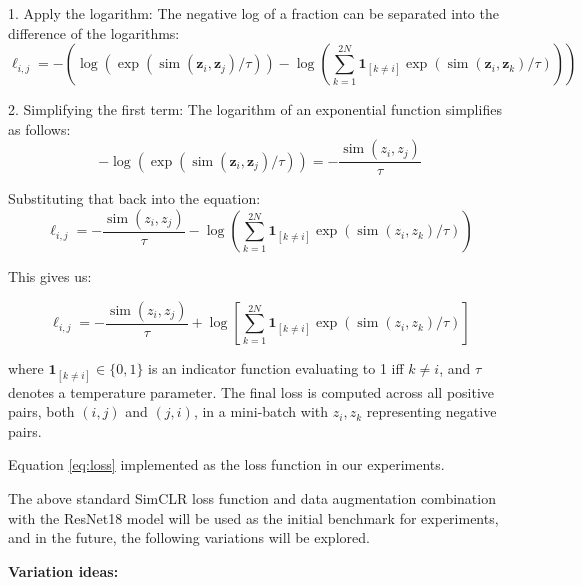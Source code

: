 \documentclass[12pt,twoside,a4paper,parskip]{scrbook} %
\begin{document}
1. Apply the logarithm: The negative log of a fraction can be separated into the difference of the logarithms:
\[
\ell_{i, j} = -\left( \log \left(\exp \left(\operatorname{sim}\left(\boldsymbol{z}_i, \boldsymbol{z}_j\right) / \tau\right)\right) - \log\left( \sum_{k=1}^{2 N} \mathbf{1}_{[k \neq i]} \exp \left(\operatorname{sim}\left(\boldsymbol{z}_i, \boldsymbol{z}_k\right) / \tau\right) \right) \right)
\]

2. Simplifying the first term: The logarithm of an exponential function simplifies as follows:
\[
-\log\left(\exp\left(\operatorname{sim}\left(\boldsymbol{z}_i, \boldsymbol{z}_j\right) / \tau\right)\right) = -\frac{\operatorname{sim}\left(z_{i}, z_{j}\right)}{\tau}
\]

Substituting that back into the equation:
\[
\ell_{i, j} = -\frac{\operatorname{sim}\left(z_{i}, z_{j}\right)}{\tau} - \log\left(\sum_{k=1}^{2 N} \mathbf{1}_{[k \neq i]} \exp\left(\operatorname{sim}\left(z_{i}, z_{k}\right) / \tau\right)\right)
\]

This gives us:

\begin{equation}
\ell_{i, j} = -\frac{\operatorname{sim}\left(z_{i}, z_{j}\right)}{\tau} + \log\left[\sum_{k=1}^{2 N} \mathbf{1}_{[k \neq i]} \exp\left(\operatorname{sim}\left(z_{i}, z_{k}\right) / \tau\right)\right]
\label{eq:loss}
\end{equation}

where \(\mathbf{1}_{[k \neq i]} \in \{0, 1\}\) is an indicator function evaluating to 1 iff \(k \neq i\), and \(\tau\) denotes a temperature parameter. The final loss is computed across all positive pairs, both \((i, j)\) and \((j, i)\), in a mini-batch with $z_i, z_k$ representing negative pairs.

Equation \ref{eq:loss} implemented as the loss function in our experiments.

The above standard SimCLR loss function and data augmentation combination  with the ResNet18 model will be used as the initial benchmark for experiments, and in the future, the following variations will be explored.

\textbf{Variation ideas:}
\end{document}
